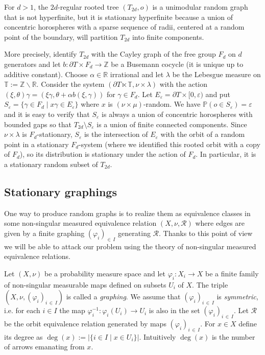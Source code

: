 \documentclass[AHL,Unicode,longabstracts,published]{cedram}
\newcommand{\bbR}{\mathbb{R}}
\newcommand{\bbZ}{\mathbb{Z}}
\newcommand{\bbT}{\mathbb{T}}
\newcommand{\bbP}{\mathbb{P}}
\newcommand{\calR}{\mathcal{R}}
\begin{document}
\begin{exam}\label{ex:hyperfinite_tree}
For $d>1$, the $2d$-regular rooted tree $(T_{2d},o)$ is a unimodular random graph that is not hyperfinite, but it is stationary hyperfinite because a union of concentric horospheres with a sparse sequence of radii, centered at a random point of the boundary, will partition $T_{2d}$ into finite components.

More precisely, identify $T_{2d}$ with the Cayley graph of the free group $F_d$ on $d$ generators and let $b\colon\partial T\times F_d\to \bbZ$ be a Busemann cocycle (it is unique up to additive constant). Choose $\alpha\in \bbR$ irrational and let $\lambda$ be the Lebesgue measure on $\bbT:=\bbZ\backslash \bbR$. Consider the system $(\partial T\ltimes \bbT,\nu\times \lambda)$ with the action $(\xi,\theta)\gamma=(\xi\gamma, \theta+\alpha b(\xi,\gamma))$ for $\gamma\in F_d.$ Let $E_\varepsilon=\partial T\times [0,\varepsilon)$ and put $S_\varepsilon=\{\gamma\in F_d \mid x\gamma\in E_\varepsilon\}$ where $x$ is $(\nu\times\mu)$-random. We have $\bbP (o\in S_\varepsilon)=\varepsilon$ and it is easy to verify that $S_\varepsilon$ is always a union of concentric horospheres with bounded gaps so that $T_{2d}\setminus S_{\varepsilon}$ is a union of finite connected components. Since $\nu\times\lambda$ is $F_d$-stationary, $S_\varepsilon$ is the intersection of $E_\varepsilon$ with the orbit of a random point in a stationary $F_d$-system (where we identified this rooted orbit with a copy of $F_d$), so its distribution is stationary under the action of $F_d$. In particular, it is a stationary random subset of $T_{2d}$.
\end{exam}



\subsection{Stationary graphings}\label{sec:stat_graphing}

One way to produce random graphs is to realize them as equivalence classes in some non-singular measured equivalence relation $(X,\nu,\calR)$ where edges are given by a finite graphing $(\varphi_i)_{\in\,I}$ generating $\calR$. Thanks to this point of view we will be able to attack our problem using the theory of non-singular measured equivalence relations.

Let $(X,\nu)$ be a probability measure space and let $\varphi_i:X_i\to X$ be a finite family of non-singular measurable maps defined on subsets $U_i$ of $X$. The triple $(X,\nu,(\varphi_i)_{i\,\in\,I})$ is called a \emph{graphing}. We assume that $(\varphi_i)_{i\,\in\,I}$ is \emph{symmetric}, i.e. for each $i\in I$ the map $\varphi_i^{-1}\colon \varphi_i(U_i)\to U_i$ is also in the set $(\varphi_i)_{i\,\in\,I}$. Let $\calR$ be the orbit equivalence relation generated by maps $(\varphi_i)_{i\,\in\,I}$. For $x\in X$ define its degree as $\deg(x):=|\{i\in I \mid x\in U_i\}|$. Intuitively $\deg(x)$ is the number of arrows emanating from $x$.
\end{document}
